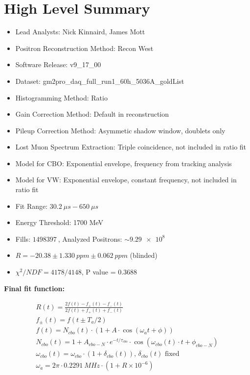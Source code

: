 \chapter*{High Level Summary}

\vspace{5mm}

\begin{itemize}
	\item{Lead Analysts: Nick Kinnaird, James Mott}
	\item{Positron Reconstruction Method: Recon West}
	\item{Software Release: v9\_17\_00}
	\item{Dataset: gm2pro\_daq\_full\_run1\_60h\_5036A\_goldList}
	\item{Histogramming Method: Ratio}
	\item{Gain Correction Method: Default in reconstruction}
	\item{Pileup Correction Method: Asymmetic shadow window, doublets only}
	\item{Lost Muon Spectrum Extraction: Triple coincidence, not included in ratio fit}
	\item{Model for CBO: Exponential envelope, frequency from tracking analysis}
	\item{Model for VW: Exponential envelope, constant frequency, not included in ratio fit}
	\item{Fit Range: $\SI{30.2}{\mu s} - \SI{650}{\mu s}$}
	\item{Energy Threshold: 1700 MeV}
	\item{Fills: $\SI{1498397}{}$, Analyzed Positrons: $\sim \SI{9.29e8}{}$}
	\item{$R = -20.38 \pm \SI{1.330}{ppm} \pm \SI{0.062}{ppm}$ (blinded)}
	\item{$\chi^{2}/NDF = 4178/4148$, P value = 0.3688}
\end{itemize}

\textbf{Final fit function:}

\begin{gather*}
		R(t) = \frac{2f(t) - f_{+}(t) - f_{-}(t)}{2f(t) + f_{+}(t) + f_{-}(t)} \\[5pt]
		f_{\pm}(t) = f(t \pm T_{a}/2) \\[5pt]
		f(t) = N_{cbo}(t) \cdot (1 + A \cdot \cos(\omega_{a}t + \phi)) \\[5pt]
		N_{cbo}(t) = 1 + A_{cbo-N} \cdot e^{-t/\tau_{cbo}} \cdot \cos(\omega_{cbo}(t) \cdot t + \phi_{cbo-N}) \\[5pt]
		\omega_{cbo}(t) = \omega_{cbo} \cdot (1 + \delta_{cbo}(t)) \text{, $\delta_{cbo}(t)$ fixed} \\[5pt]
		\omega_{a} = 2 \pi \cdot \SI{0.2291}{MHz} \cdot (1 + R \times 10^{-6})
\end{gather*}

